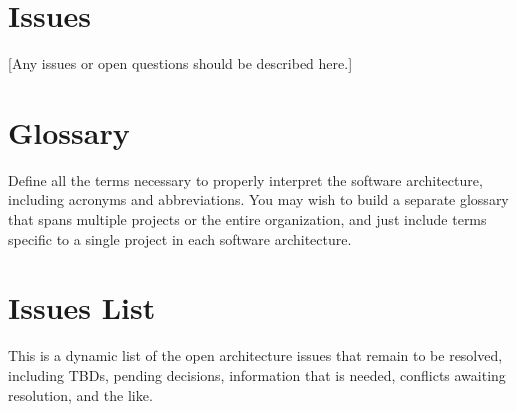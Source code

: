 \documentclass[12pt,oneside,letterpaper]{article}
\begin{document}
\section{Issues}
[Any issues or open questions should be described here.]

\appendix
\section{Glossary}
Define all the terms necessary to properly interpret the software architecture, including acronyms and abbreviations. You may wish to build a separate glossary that spans multiple projects or the entire organization, and just include terms specific to a single project in each software architecture.

\section{Issues List}
This is a dynamic list of the open architecture issues that remain to be resolved, including TBDs, pending decisions, information that is needed, conflicts awaiting resolution, and the like.
\end{document}
